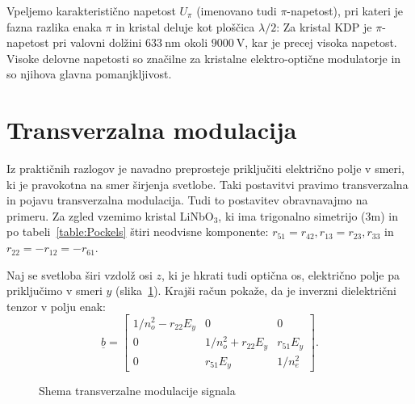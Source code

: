 Vpeljemo karakteristično napetost $U_\pi$ (imenovano tudi $\pi$-napetost), 
pri kateri je 
fazna razlika enaka $\pi$ in kristal deluje kot ploščica $\lambda/2$:
Za kristal KDP je $\pi$-napetost pri valovni 
dolžini $633~\si{\nano\metre}$ okoli  $9000~\si{\volt}$, kar 
je precej visoka napetost. Visoke delovne napetosti
so značilne za kristalne elektro-optične modulatorje in so njihova
glavna pomanjkljivost. 

\section{Transverzalna modulacija}
Iz praktičnih razlogov je navadno preprosteje priključiti električno polje v smeri, ki 
je pravokotna na smer širjenja svetlobe. Taki postavitvi pravimo transverzalna in pojavu
transverzalna modulacija.
Tudi to postavitev obravnavajmo na primeru. Za zgled vzemimo kristal LiNbO$_3$, ki 
ima trigonalno simetrijo (3m) in po tabeli~\ref{table:Pockels} štiri 
neodvisne komponente: $r_{51}=r_{42}, r_{13}=r_{23}, r_{33}$ in $r_{22}=-r_{12}=-r_{61}$.

Naj se svetloba širi vzdolž osi $z$, ki je hkrati tudi optična os, 
električno polje pa priključimo v smeri $y$ (slika~\ref{fig:tmshema}). 
Krajši račun pokaže, da je inverzni dielektrični tenzor v polju enak:
\begin{equation}
\underline{b} = 
 \left[\begin{array}{ccc}
1/n_o^2  -r_{22}E_y& 0& 0\\
0& 1/n_o^2+r_{22}E_y& r_{51}E_y\\
0 & r_{51}E_y&  1/n_e^2
\end{array}\right]\!\!.
\label{7.8b}
\end{equation}

\begin{figure}[ht]
\centering
\def\svgwidth{80truemm} 

\caption{Shema transverzalne modulacije signala}
\label{fig:tmshema}
\end{figure}
\newpage

